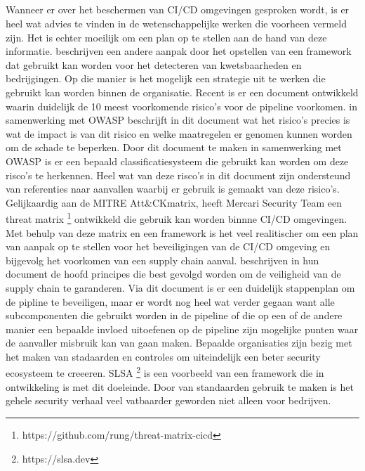 \subsection{}
\label{sec:Security framework en bedrijgingsmatrix}
Wanneer er over het beschermen van CI/CD omgevingen gesproken wordt, is er heel wat advies te vinden in de wetenschappelijke werken die voorheen vermeld zijn. Het is echter moeilijk om een plan op te stellen aan de hand van deze informatie. \autocite{Koopman2019AFF} beschrijven een andere aanpak door het opstellen van een framework dat gebruikt kan worden voor het detecteren van kwetsbaarheden en bedrijgingen. Op die manier is het mogelijk een strategie uit te werken die gebruikt kan worden binnen de organisatie. Recent is er een document ontwikkeld waarin duidelijk de 10 meest voorkomende risico's voor de pipeline voorkomen. \textcite{Security2022} in samenwerking met OWASP beschrijft in dit document wat het risico's precies is wat de impact is van dit risico en welke maatregelen er genomen kunnen worden om de schade te beperken. Door dit document te maken in samenwerking met OWASP is er een bepaald classificatiesysteem die gebruikt kan worden om deze risco's te herkennen. Heel wat van deze risco's in dit document zijn ondersteund van referenties naar aanvallen waarbij er gebruik is gemaakt van deze risico's. Gelijkaardig aan de MITRE Att\&CK\textregistered matrix, heeft Mercari Security Team een threat matrix \footnote{https://github.com/rung/threat-matrix-cicd} ontwikkeld die gebruik kan worden binnne CI/CD omgevingen. Met behulp van deze matrix en een framework is het veel realitischer om een plan van aanpak op te stellen voor het beveiligingen van de CI/CD omgeving en bijgevolg het voorkomen van een supply chain aanval. \textcite{Foundation2021} beschrijven in hun document de hoofd principes die best gevolgd worden om de veiligheid van de supply chain te garanderen. Via dit document is er een duidelijk stappenplan om de pipline te beveiligen, maar er wordt nog heel wat verder gegaan want alle subcomponenten die gebruikt worden in de pipeline of die op een of de andere manier een bepaalde invloed uitoefenen op de pipeline zijn mogelijke punten waar de aanvaller misbruik kan van gaan maken. Bepaalde organisaties zijn bezig met het maken van stadaarden en controles om uiteindelijk een beter security ecosysteem te creeeren. SLSA \footnote {https://slsa.dev} is een voorbeeld van een framework die in ontwikkeling is met dit doeleinde. Door van standaarden gebruik te maken is het gehele security verhaal veel vatbaarder geworden niet alleen voor bedrijven. 


